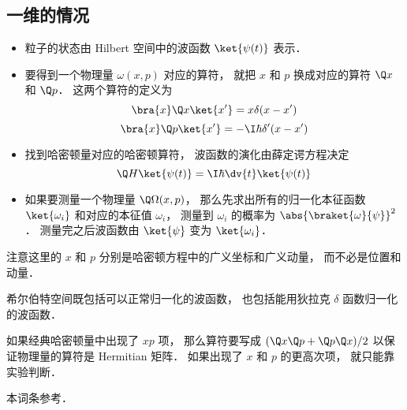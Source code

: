 
\begin{issues}
\issueDraft
\end{issues}



\subsection{一维的情况}
\begin{itemize}
\item 粒子的状态由 Hilbert 空间中的波函数 $\ket{\psi(t)}$ 表示．
\item 要得到一个物理量 $\omega(x, p)$ 对应的算符， 就把 $x$ 和 $p$ 换成对应的算符 $\Q x$ 和 $\Q p$． 这两个算符的定义为
\begin{equation}
\bra{x}\Q x \ket{x'} = x\delta(x-x')
\end{equation}
\begin{equation}
\bra{x}\Q p \ket{x'} = -\I\hbar \delta'(x-x')
\end{equation}
\item 找到哈密顿量对应的哈密顿算符， 波函数的演化由薛定谔方程决定
\begin{equation}
\Q H \ket{\psi(t)} = \I \hbar \dv{t} \ket{\psi(t)}
\end{equation}
\item 如果要测量一个物理量 $\Q\Omega(x, p)$， 那么先求出所有的归一化本征函数 $\ket{\omega_i}$ 和对应的本征值 $\omega_i$， 测量到 $\omega_i$ 的概率为 $\abs{\braket{\omega}{\psi}}^2$． 测量完之后波函数由 $\ket{\psi}$ 变为 $\ket{\omega_i}$．
\end{itemize}

注意这里的 $x$ 和 $p$ 分别是哈密顿方程中的广义坐标和广义动量， 而不必是位置和动量．

希尔伯特空间既包括可以正常归一化的波函数， 也包括能用狄拉克 $\delta$ 函数归一化的波函数．

如果经典哈密顿量中出现了 $xp$ 项， 那么算符要写成 $(\Q x \Q p + \Q p \Q x)/2$ 以保证物理量的算符是 Hermitian 矩阵． 如果出现了 $x$ 和 $p$ 的更高次项， 就只能靠实验判断．

本词条参考\cite{Shankar}．
